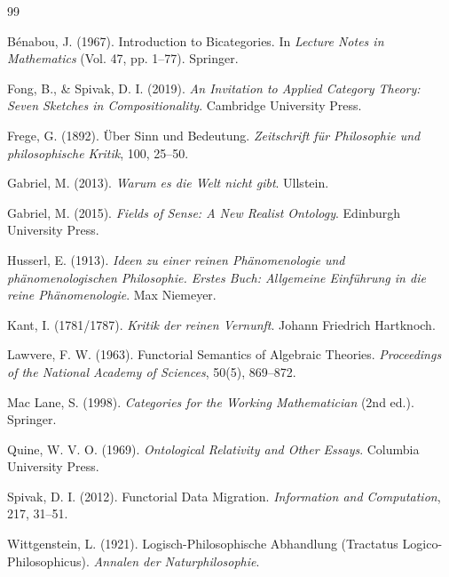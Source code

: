 \documentclass[11pt,a4paper]{article}
\theoremstyle{definition}
\theoremstyle{plain}
\begin{document}
\begin{thebibliography}{99}

B\'enabou, J. (1967). Introduction to Bicategories. In \textit{Lecture Notes in Mathematics} (Vol. 47, pp. 1--77). Springer.

Fong, B., \& Spivak, D. I. (2019). \textit{An Invitation to Applied Category Theory: Seven Sketches in Compositionality}. Cambridge University Press.

Frege, G. (1892). \"Uber Sinn und Bedeutung. \textit{Zeitschrift f\"ur Philosophie und philosophische Kritik}, 100, 25--50.

Gabriel, M. (2013). \textit{Warum es die Welt nicht gibt}. Ullstein.

Gabriel, M. (2015). \textit{Fields of Sense: A New Realist Ontology}. Edinburgh University Press.

Husserl, E. (1913). \textit{Ideen zu einer reinen Ph\"anomenologie und ph\"anomenologischen Philosophie. Erstes Buch: Allgemeine Einf\"uhrung in die reine Ph\"anomenologie}. Max Niemeyer.

Kant, I. (1781/1787). \textit{Kritik der reinen Vernunft}. Johann Friedrich Hartknoch.

Lawvere, F. W. (1963). Functorial Semantics of Algebraic Theories. \textit{Proceedings of the National Academy of Sciences}, 50(5), 869--872.

Mac Lane, S. (1998). \textit{Categories for the Working Mathematician} (2nd ed.). Springer.

Quine, W. V. O. (1969). \textit{Ontological Relativity and Other Essays}. Columbia University Press.

Spivak, D. I. (2012). Functorial Data Migration. \textit{Information and Computation}, 217, 31--51.

Wittgenstein, L. (1921). Logisch-Philosophische Abhandlung (Tractatus Logico-Philosophicus). \textit{Annalen der Naturphilosophie}.

\end{thebibliography}
\end{document}

